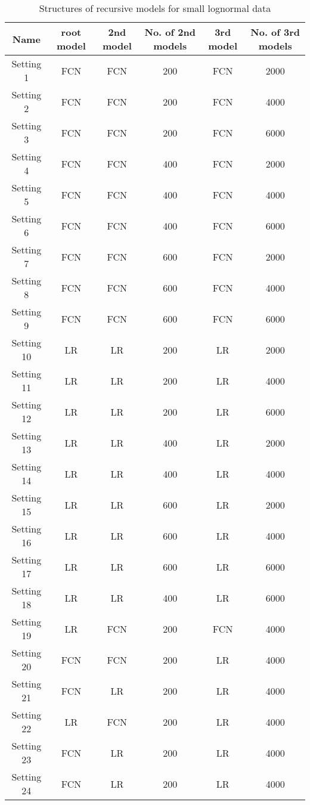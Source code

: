 \begin{table}
	\centering
	\begin{tabular}{||c | c | c | c | c | c||}
		\hline
		Name& root model & 2nd model & No. of 2nd models & 3rd model & No. of 3rd models \\ [0.5ex] 
		\hline
		\hline
		Setting 1  & FCN& FCN& 200 & FCN& 2000\\
		\hline
		Setting 2  & FCN& FCN& 200 & FCN& 4000\\
		\hline
		Setting 3  & FCN& FCN& 200 & FCN& 6000\\
		\hline
		Setting 4  & FCN& FCN& 400 & FCN& 2000\\ 
		\hline
		Setting 5  & FCN& FCN& 400 & FCN& 4000\\
		\hline
		Setting 6  & FCN& FCN& 400 & FCN& 6000\\
		\hline 
		Setting 7  & FCN& FCN& 600 & FCN& 2000\\
		\hline 
		Setting 8  & FCN& FCN& 600 & FCN& 4000\\
		\hline 
		Setting 9  & FCN& FCN& 600 & FCN& 6000\\
		\hline
		Setting 10 & LR & LR& 200 & LR& 2000\\
		\hline
		Setting 11 & LR & LR& 200 & LR& 4000\\
		\hline
		Setting 12 & LR & LR& 200 & LR& 6000\\
		\hline
		Setting 13 & LR & LR& 400 & LR& 2000\\ 
		\hline
		Setting 14 & LR & LR& 400 & LR& 4000\\ 
		\hline
		Setting 15 & LR & LR& 600 & LR& 2000\\ 
		\hline
		Setting 16 & LR & LR& 600 & LR& 4000\\ 
		\hline
		Setting 17 & LR & LR& 600 & LR& 6000\\ 
		\hline
		Setting 18 & LR & LR& 400 & LR& 6000\\ 
		\hline
		Setting 19 & LR & FCN& 200 & FCN& 4000\\
		\hline
		Setting 20 & FCN& FCN& 200 & LR& 4000\\
		\hline 
		Setting 21 & FCN& LR& 200 & LR& 4000\\
		\hline 
		Setting 22 & LR & FCN& 200 & LR& 4000\\
		\hline 
		Setting 23 & FCN& LR& 200 & LR& 4000\\
		\hline
		Setting 24 & FCN& LR& 200 & LR& 4000\\
		\hline
		\hline
	\end{tabular}
	\label{small_lognormal_settings}
	\caption{Structures of recursive models for small lognormal data}
\end{table}

